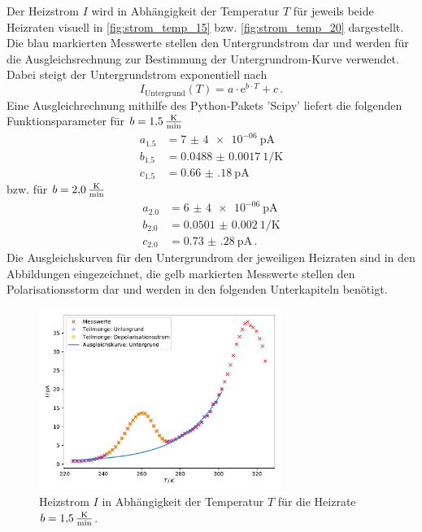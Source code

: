 Der Heizstrom $I$ wird in Abhängigkeit der Temperatur $T$ für jeweils beide Heizraten visuell in \autoref{fig:strom_temp_15} bzw. \autoref{fig:strom_temp_20} dargestellt.
Die blau markierten Messwerte stellen den Untergrundstrom dar und werden für die Ausgleichsrechnung zur Bestimmung der Untergrundrom-Kurve verwendet.
Dabei steigt der Untergrundstrom exponentiell nach
\begin{equation}
    I_\text{Untergrund}(T) = a \cdot \mathrm{e}^{b\cdot T} + c \, .
    \label{eqn:untergrund}
\end{equation}
Eine Ausgleichrechnung mithilfe des Python-Pakets 'Scipy'\cite{scipy} liefert die folgenden Funktionsparameter für $b = \SI{1.5}{\frac{\kelvin}{\minute}}$
\begin{align*}
    a_{1.5} &= \SI{7(4)e-06}{\pico\ampere} \\
    b_{1.5} &= \SI{0.0488(17)}{1 / \kelvin} \\
    c_{1.5} &= \SI{0.66(18)}{\pico\ampere}
\end{align*}
bzw. für $b = \SI{2.0}{\frac{\kelvin}{\minute}}$
\begin{align*}
    a_{2.0} &= \SI{6(4)e-06}{\pico\ampere} \\
    b_{2.0} &= \SI{0.0501(20)}{1 / \kelvin} \\
    c_{2.0} &= \SI{0.73(28)}{\pico\ampere} \, .
\end{align*}
Die Ausgleichskurven für den Untergrundrom der jeweiligen Heizraten sind in den Abbildungen eingezeichnet, die gelb markierten Messwerte stellen den Polarisationsstorm dar und werden in den folgenden Unterkapiteln benötigt. 

\begin{figure}
    \centering
    \includegraphics[width=0.7\textwidth]{content/data/T_I_kurve_15.pdf}
    \caption{Heizstrom $I$ in Abhängigkeit der Temperatur $T$ für die Heizrate $b = \SI{1.5}{\frac{\kelvin}{\minute}}$. \cite{numpy}\cite{matplotlib}\cite{scipy}}
    \label{fig:strom_temp_15}
\end{figure}

